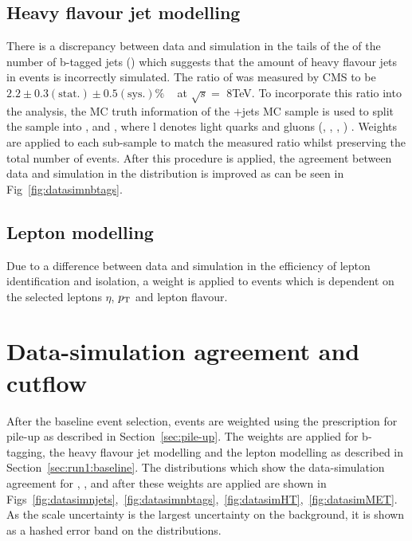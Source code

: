 \subsection{Heavy flavour jet modelling}

There is a discrepancy between data and simulation in the tails of the  of the number of b-tagged jets (\nbtags) which suggests that the amount of heavy flavour jets in \ttbar events is incorrectly simulated. The ratio of \heavyflavour was measured by CMS to be $2.2 \pm 0.3 \left( \textrm{stat.} \right) \pm 0.5 \left(\textrm{sys.} \right)\% $ ~\cite{CMS:2014yxa} at $\sqrt{s} =$ 8TeV. To incorporate this ratio into the analysis, the MC truth information of the \ttbar$+$jets MC sample is used to split the sample into \ttbb, \ttcc and \ttll, where l denotes light quarks and gluons (\cPqu, \cPqd, \cPqs, \cPg) . Weights are applied to each sub-sample to match the measured ratio whilst preserving the total number of \ttbar events. After this procedure is applied, the agreement between data and simulation in the \nbtags distribution is improved as can be seen in Fig~\ref{fig:datasimnbtags}.

\subsection{Lepton modelling}
Due to a difference between data and simulation in the efficiency of lepton identification and isolation, a weight is applied to events which is dependent on the selected leptons $\eta$, $p_{\mathrm{T}}$ and lepton flavour.
\section{Data-simulation agreement and cutflow}

After the baseline event selection, events are weighted using the prescription for pile-up as described in Section~\ref{sec:pile-up}. The weights are applied for b-tagging, the heavy flavour jet modelling and the lepton modelling as described in Section~\ref{sec:run1:baseline}. The distributions which show the data-simulation agreement for \njets, \nbtags, \HT and \MET after these weights are applied are shown in Figs~\ref{fig:datasimnjets},~\ref{fig:datasimnbtags},~\ref{fig:datasimHT},~\ref{fig:datasimMET}. As the scale uncertainty is the largest uncertainty on the background, it is shown as a hashed error band on the distributions.


